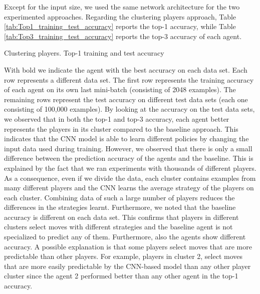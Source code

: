 Except for the input size, we used the same network architecture for the two experimented approaches. Regarding the clustering players approach, Table \ref{tab:Top1_training_test_accuracy} reports the top-1 accuracy, while Table \ref{tab:Top3_training_test_accuracy} reports the top-3 accuracy of each agent. 
\begin{table}[b]
    \centering
    \small
    \caption{Clustering players. Top-1 training and test accuracy} 
    
    \label{tab:Top1_training_test_accuracy}
\end{table}
With bold we indicate the agent with the best accuracy on each data set. Each row represents a different data set. The first row represents the training accuracy of each agent on its own last mini-batch (consisting of 2048 examples). The remaining rows represent the test accuracy on different test data sets (each one consisting of 100,000 examples). By looking at the accuracy on the test data sets, we observed that in both the top-1 and top-3 accuracy, each agent better represents the players in its cluster compared to the baseline approach. This indicates that the \acs{CNN} model is able to learn different policies by changing the input data used during training. However, we observed that there is only a small difference between the prediction accuracy of the agents and the baseline. This is explained by the fact that we ran experiments with thousands of different players. As a consequence, even if we divide the data, each cluster contains examples from many different players and the \acs{CNN} learns the average strategy of the players on each cluster. Combining data of such a large number of players reduces the differences in the strategies learnt. Furthermore, we noted that the baseline accuracy is different on each data set. This confirms that players in different clusters select moves with different strategies and the baseline agent is not specialized to predict any of them. Furthermore, also the agents show different accuracy. A possible explanation is that some players select moves that are more predictable than other players. For example, players in cluster 2, select moves that are more easily predictable by the \acs{CNN}-based model than any other player cluster since the agent 2 performed better than any other agent in the top-1 accuracy.
